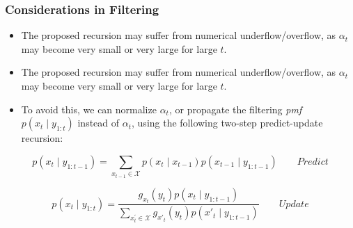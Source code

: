 \documentclass[xcolor=dvipsnames, compress]{beamer}
\begin{document}
\begin{frame}
\frametitle{Considerations in Filtering}
\begin{itemize}
	\item 	The proposed recursion may suffer from numerical underflow/overflow,
	as $\alpha_{t}$ may become very small or very large for large $t$. 
	\item  The proposed recursion may suffer from numerical underflow/overflow,
	as $\alpha_{t}$ may become very small or very large for large $t$. 
	\item To avoid this, we can normalize $\alpha_{t}$, or propagate the filtering
	\emph{pmf $p\left(x_{t}\mid y_{1:t}\right)$ }instead of $\alpha_{t}$,
	using the following two-step predict-update recursion:
\end{itemize}
$$
p\left(x_{t}\mid y_{1:t-1}\right)=\sum_{x_{t-1}\in\mathcal{{X}}}p\left(x_{t}\mid x_{t-1}\right)p\left(x_{t-1}\mid y_{1:t-1}\right)\qquad Predict
$$

$$
p\left(x_{t}\mid y_{1:t}\right)=\frac{g_{x_{t}}\left(y_{t}\right)p\left(x_{t}\mid y_{1:t-1}\right)}{\sum_{x_{t}^{'}\in\mathcal{{X}}}g_{x'_{t}}\left(y_{t}\right)p\left(x'_{t}\mid y_{1:t-1}\right)}\qquad Update
$$
\end{frame}



%
 
 
\end{document}
